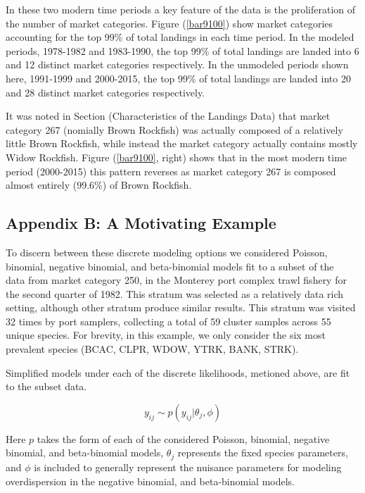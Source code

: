 \documentclass[12pt]{article}
\begin{document}
In these two modern time periods a key feature of the data is the
proliferation of the number of market categories. Figure (\ref{bar9100}) 
show market categories accounting for the top 99\% of total
landings in each time period. In the modeled periods, 1978-1982 and
1983-1990, the top 99\% of total landings are landed into 6 and 12
distinct market categories respectively. In the unmodeled periods shown
here, 1991-1999 and 2000-2015, the top 99\% of total landings are landed
into 20 and 28 distinct market categories respectively.

It was noted in Section (Characteristics of the Landings Data) that
market category 267 (nomially Brown Rockfish) was actually composed of a
relatively little Brown Rockfish, while instead the market category
actually contains mostly Widow Rockfish. Figure (\ref{bar9100}, right) shows that in
the most modern time period (2000-2015) this pattern reverses as market
category 267 is composed almost entirely (99.6\%) of Brown Rockfish.

\subsection{Appendix B: A Motivating Example}\label{appB}

To discern between these discrete modeling options we considered
Poisson, binomial, negative binomial, and beta-binomial models fit to a
subset of the\\
data from market category 250, in the Monterey port complex trawl
fishery for the second quarter of 1982. This stratum was selected as a
relatively data rich setting, although other stratum produce similar
results. This stratum was visited 32 times by port samplers, collecting
a total of 59 cluster samples across 55 unique species. For brevity, in
this example, we only consider the six most prevalent species (BCAC,
CLPR, WDOW, YTRK, BANK, STRK).

Simplified models under each of the discrete likelihoods, metioned
above, are fit to the subset data.

\[y_{ij}\sim p(y_{ij}|\theta_j, \phi)\]

Here \(p\) takes the form of each of the considered Poisson, binomial,
negative binomial, and beta-binomial models, \(\theta_j\) represents the
fixed species parameters, and \(\phi\) is included to generally
represent the nuisance parameters for modeling overdispersion in the
negative binomial, and beta-binomial models.
\end{document}
